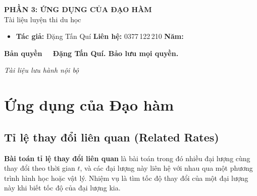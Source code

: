 \documentclass[12pt,a4paper]{article}
\begin{document}
\thispagestyle{empty}
\vspace*{5cm}
\begin{center}
  {\Large\bfseries PHẦN 3: ỨNG DỤNG CỦA ĐẠO HÀM}\\[8pt]
  {\large Tài liệu luyện thi du học}
\end{center}
\vspace{2cm}
\begin{tcolorbox}[enhanced, colback=red!3!white, colframe=red!60!black, fonttitle=\bfseries, title={Thông tin bản quyền}, boxrule=1.5pt]
  \begin{itemize}[leftmargin=*]
    \item \textbf{Tác giả:} Đặng Tấn Quí \quad \textbf{Liên hệ:} 0377\,122\,210 \quad \textbf{Năm:} \the\year
  \end{itemize}
  \vspace{6pt}
  \textbf{Bản quyền \textcopyright\ \the\year\ Đặng Tấn Quí. Bảo lưu mọi quyền.}
\end{tcolorbox}
\vfill
\begin{center}\small\textit{Tài liệu lưu hành nội bộ}\end{center}
\newpage
\tableofcontents
\newpage

\section{Ứng dụng của Đạo hàm}

\subsection{Tỉ lệ thay đổi liên quan (Related Rates)}

\begin{dinhnghia}
  \textbf{Bài toán tỉ lệ thay đổi liên quan} là bài toán trong đó nhiều đại lượng cùng thay đổi theo thời gian $t$, và các đại lượng này liên hệ với nhau qua một phương trình hình học hoặc vật lý. Nhiệm vụ là tìm tốc độ thay đổi của một đại lượng này khi biết tốc độ của đại lượng kia.
\end{dinhnghia}
\end{document}
